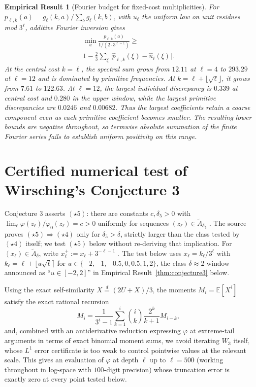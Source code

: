 \documentclass[11pt]{article}
\newtheorem{empirical}[theorem]{Empirical Result}
\theoremstyle{remark}
\begin{document}
\begin{empirical}[Fourier budget for fixed-cost multiplicities]
\label{thm:microcanonical-fourier}
For $p_{\ell,k}(a)=g_\ell(k,a)/\sum_b g_\ell(k,b)$, with $u_\ell$ the
uniform law on unit residues mod $3^\ell$, additive Fourier
inversion gives
\begin{multline*}
 \min_a\frac{p_{\ell,k}(a)}{1/(2\cdot3^{\ell-1})}
 \ge{} \\
 1-\frac23\sum_\xi
 \bigl|\widehat p_{\ell,k}(\xi)-\widehat u_\ell(\xi)\bigr|.
\end{multline*}
At the central cost $k=\ell$, the spectral sum grows from $12.11$ at
$\ell=4$ to $293.29$ at $\ell=12$ and is dominated by primitive
frequencies. At $k=\ell+\lfloor\sqrt\ell\rfloor$, it grows from $7.61$
to $122.63$. At $\ell=12$, the largest individual discrepancy is
$0.339$ at central cost and $0.280$ in the upper window, while the
largest primitive discrepancies are $0.0246$ and $0.00682$. Thus the
largest coefficients retain a coarse component even as each primitive
coefficient becomes smaller. The resulting lower bounds are negative
throughout, so termwise absolute summation of the finite Fourier
series fails to establish uniform positivity on this range.
\end{empirical}

\section{Certified numerical test of Wirsching's Conjecture 3}
\label{sec:conj3}

Conjecture 3 asserts $(\star5)$: there are constants $c,\delta_5>0$
with $\lim_\ell\varphi(z_\ell)/\varphi_0(z_\ell)=c>0$ uniformly for
sequences $(z_\ell)\in\widetilde A_{\delta_5}$
\cite[\S7]{Wirsching2003}. The source proves $(\star5)\Rightarrow
(\star4)$ only for $\delta_5>\delta$, strictly larger than the class
tested by $(\star4)$ itself; we test $(\star5)$ below without
re-deriving that implication. For $(x_\ell)\in\widetilde A_\delta$,
write $x_\ell^+:=x_\ell+3^{-\ell-1}$ \cite[\S7]{Wirsching2003}. The
test below uses $x_\ell=k_\ell/3^\ell$ with $k_\ell=\ell+\lfloor
u\sqrt\ell\rceil$ for $u\in\{-2,-1,-0.5,0,0.5,1,2\}$, the class
$\delta\approx2$ window announced as ``$u\in[-2,2]$'' in
Empirical Result~\ref{thm:conjecture3} below.

Using the exact self-similarity $X\overset{d}{=}(2U+X)/3$, the moments
$M_i=\mathbb{E}[X^i]$ satisfy the exact rational recursion
\[
  M_i = \frac{1}{3^i-1}\sum_{k=1}^i \binom{i}{k}\frac{2^k}{k+1} M_{i-k},
\]
and, combined with an antiderivative reduction expressing $\varphi$ at
extreme-tail arguments in terms of exact binomial moment sums, we
avoid iterating $W_3$ itself, whose $L^1$ error certificate is too
weak to control pointwise values at the relevant scale. This gives an
evaluation of $\varphi$ at depth $\ell$ up to
$\ell=500$ (working throughout in log-space with $100$-digit
precision) whose truncation error is exactly zero at every point
tested below.
\end{document}
